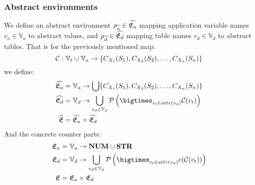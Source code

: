 \subsubsection{Abstract environments}

We define an abstract environment $\rho_{\widehat{a}} \in \widehat{\mathfrak{E}_a}$ mapping application variable names $v_a \in \mathbb{V}_a$ to abstract values, and $\rho_{\widehat{d}} \in \widehat{\mathfrak{E}_d}$ mapping table names $v_d \in \mathbb{V}_d$ to abstract tables.
That is for the previously mentioned map:
\begin{equation}
    \mathcal{C} : \mathbb{V}_t \cup \mathbb{V}_a \rightarrow \{ C_{X_1}(S_1), C_{X_2}(S_2), \dots, C_{X_n}(S_n) \}
\end{equation}
we define:
\begin{align}
    \ab{\mathfrak{E}_a} &= \mathbb{V}_a \rightarrow \bigcup \{ C_{X_1}(S_1), C_{X_2}(S_2), \dots, C_{X_n}(S_n) \} \\
    \ab{\mathfrak{E}_d} &= \mathbb{V}_d \rightarrow \bigcup_{v_d \in \mathbb{V}_d} \mathcal{P}\left(\bigtimes_{v_t \in attr(v_d)}\lookupcl(v_t)\right) \\
    \ab{\mathfrak{E}} &= \ab{\mathfrak{E}_a} \times \ab{\mathfrak{E}_d}
\end{align}
And the concrete counter parts:
\begin{align}
    \mathfrak{E}_a &= \mathbb{V}_a \rightarrow \nums \cup \strs \\
    \mathfrak{E}_d &= \mathbb{V}_d \rightarrow \bigcup_{v_d \in \mathbb{V}_d} \mathcal{P}\left(\bigtimes_{v_t \in attr(v_d)}\cc(\lookupcl(v_t))\right) \\
    \mathfrak{E} &= \mathfrak{E}_a \times \mathfrak{E}_d
\end{align}

